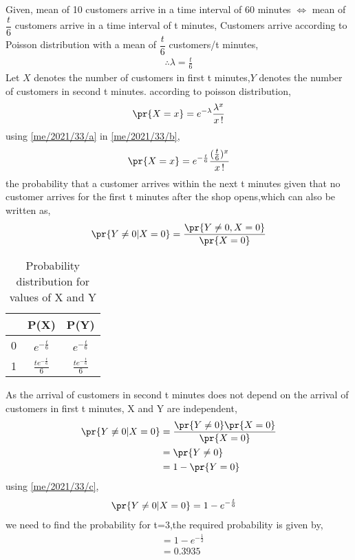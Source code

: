 Given, 
mean of 10 customers arrive in a time interval of 60 minutes $\iff$ mean of $\dfrac{t}{6}$ customers arrive in a time interval of t minutes,
Customers arrive according to Poisson distribution with a mean of $\dfrac{t}{6}$ customers/t minutes,
\begin{align}
\therefore \lambda = \frac{t}{6} \label{me/2021/33/a}
\end{align}
Let $X$ denotes the number of customers in first t minutes,$Y$ denotes the number of customers in second t minutes.
according to  poisson distribution,
\begin{align}
\pr{X=x}= e^{-\lambda} \frac{\lambda^{x}}{x\,!} \label{me/2021/33/b}
\end{align}
using \eqref{me/2021/33/a} in \eqref{me/2021/33/b},
\begin{align}
\pr{X=x}= e^{-\frac{t}{6}} \frac{(\frac{t}{6})^{x}}{x\,!} \label{me/2021/33/c}
\end{align}
 the probability that a customer arrives within the next t minutes given that no customer arrives for the first t minutes after the shop opens,which can also be written as,
\begin{align}
\pr{Y\neq 0|X=0}=\frac{\pr{Y\neq 0,X=0}}{\pr{X=0}}
\end{align}
\begin{table}[ht]
\caption{Probability distribution for values of X and Y}
\begin{center}
    \begin{tabular}{|c|c|c|}
    \hline
     & P(X)&P(Y)\\
    \hline
    0& $e^{-\frac{t}{6}}$& $e^{-\frac{t}{6}}$\\
    \hline
    1 & $\frac{t e^{-\frac{t}{6}}}{6}$ & $\frac{t e^{-\frac{t}{6}}}{6}$\\
    \hline
    \end{tabular}
\end{center} 
\end{table}
As the arrival of customers in second t minutes does not depend on the arrival of customers in first t minutes, X and Y are independent,
\begin{align}
\pr{Y\neq 0|X=0}&=\frac{\pr{Y\neq 0}\pr{X=0}}{\pr{X=0}}\\
&=\pr{Y\neq 0}\\
&= 1-\pr{Y=0} 
\end{align}
using \eqref{me/2021/33/c},
\begin{align}
\pr{Y\neq 0|X=0}&=1- e^{-\frac{t}{6}}
\end{align}
we need to find the probability for t=3,the required probability is given by,
\begin{align}
&=1- e^{-\frac{1}{2}}\\
&=0.3935
\end{align}